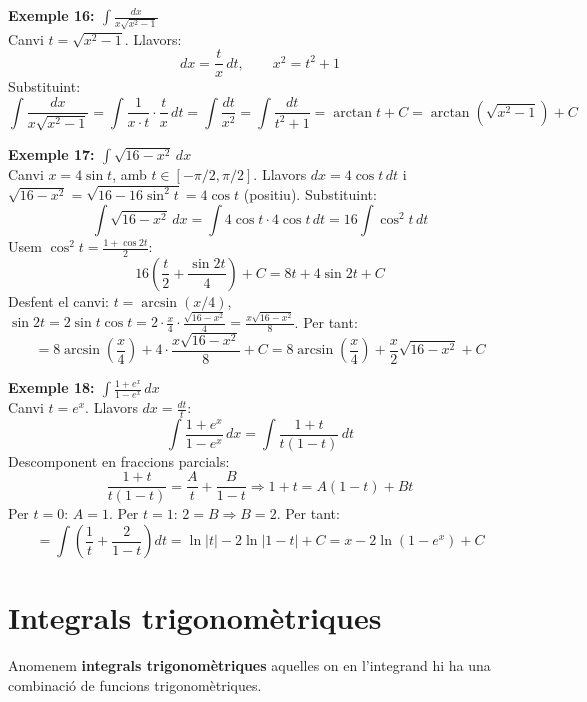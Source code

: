 \documentclass[12pt]{article}
\begin{document}
\begin{exemple}
\textbf{Exemple 16: $\displaystyle \int \frac{dx}{x\sqrt{x^2-1}}$}\\
Canvi $t = \sqrt{x^2-1}$. Llavors:
\[
dx = \frac{t}{x}\,dt, \qquad x^2 = t^2+1
\]
Substituint:
\[
\int \frac{dx}{x\sqrt{x^2-1}} = \int \frac{1}{x \cdot t} \cdot \frac{t}{x}\,dt = \int \frac{dt}{x^2} = \int \frac{dt}{t^2+1} = \arctan t + C = \arctan(\sqrt{x^2-1}) + C
\]
\end{exemple}

\begin{exemple}
\textbf{Exemple 17: $\displaystyle \int \sqrt{16-x^2}\,dx$}\\
Canvi $x = 4\sin t$, amb $t \in [-\pi/2, \pi/2]$. Llavors $dx = 4\cos t\,dt$ i $\sqrt{16-x^2} = \sqrt{16-16\sin^2 t} = 4\cos t$ (positiu). Substituint:
\[
\int \sqrt{16-x^2}\,dx = \int 4\cos t \cdot 4\cos t\,dt = 16\int \cos^2 t\,dt
\]
Usem $\cos^2 t = \frac{1+\cos 2t}{2}$:
\[
16\left( \frac{t}{2} + \frac{\sin 2t}{4} \right) + C = 8t + 4\sin 2t + C
\]
Desfent el canvi: $t = \arcsin(x/4)$, $\sin 2t = 2\sin t\cos t = 2\cdot \frac{x}{4} \cdot \frac{\sqrt{16-x^2}}{4} = \frac{x\sqrt{16-x^2}}{8}$. Per tant:
\[
= 8\arcsin\left(\frac{x}{4}\right) + 4\cdot \frac{x\sqrt{16-x^2}}{8} + C = 8\arcsin\left(\frac{x}{4}\right) + \frac{x}{2}\sqrt{16-x^2} + C
\]
\end{exemple}

\begin{exemple}
\textbf{Exemple 18: $\displaystyle \int \frac{1+e^x}{1-e^x}\,dx$}\\
Canvi $t = e^x$. Llavors $dx = \frac{dt}{t}$:
\[
\int \frac{1+e^x}{1-e^x}\,dx = \int \frac{1+t}{t(1-t)}\,dt
\]
Descomponent en fraccions parcials:
\[
\frac{1+t}{t(1-t)} = \frac{A}{t} + \frac{B}{1-t} \Rightarrow 1+t = A(1-t) + Bt
\]
Per $t=0$: $A=1$. Per $t=1$: $2 = B \Rightarrow B=2$. Per tant:
\[
= \int \left( \frac{1}{t} + \frac{2}{1-t} \right) dt = \ln|t| - 2\ln|1-t| + C = x - 2\ln(1-e^x) + C
\]
\end{exemple}


\section{Integrals trigonomètriques}

Anomenem \textbf{integrals trigonomètriques} aquelles on en l'integrand hi ha una combinació de funcions trigonomètriques.
\end{document}
